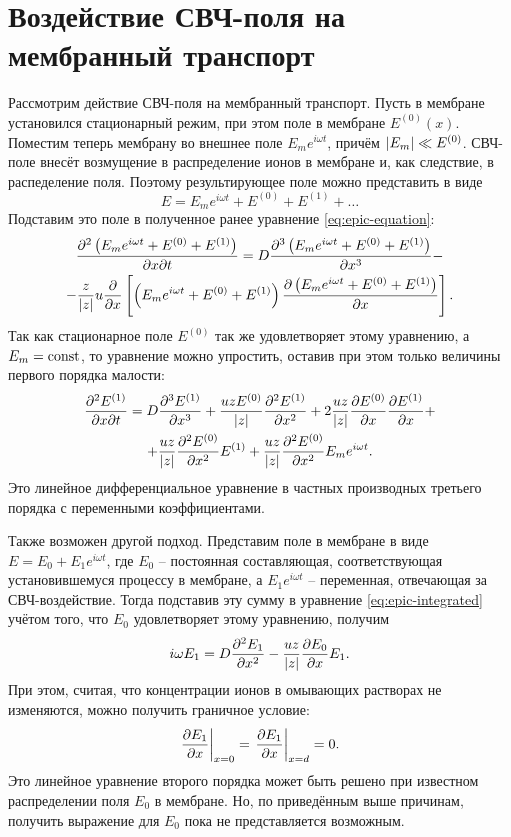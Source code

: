 \section{Воздействие СВЧ-поля на мембранный транспорт}

Рассмотрим действие СВЧ-поля на мембранный транспорт. Пусть в мембране
установился стационарный режим, при этом поле в мембране \( E^{(0)}(x) \).
Поместим теперь мембрану во внешнее поле \( E_m e^{i\omega t} \), причём
\( \left| E_m \right| \ll E^{(0)} \). СВЧ-поле внесёт возмущение в распределение
ионов в мембране и, как следствие, в распеделение поля. Поэтому результирующее
поле можно представить в виде
\begin{equation}
    E = E_m e^{i\omega t} + E^{(0)} + E^{(1)} + \ldots
\end{equation}
Подставим это поле в полученное ранее уравнение \eqref{eq:epic-equation}:
\begin{gather*}
    \frac{\partial^2 \left(E_m e^{i\omega t} + E^{(0)} + E^{(1)}\right)}{\partial x \partial t} =
     D\frac{\partial^3
         \left(E_m e^{i\omega t} + E^{(0)} + E^{(1)}\right)
    }{\partial x^3}
     -\\-
    \frac{z}{\left| z \right|}u\frac{\partial }{\partial x}\left[
    \left(E_m e^{i\omega t} + E^{(0)} + E^{(1)}\right)
    \frac{\partial \left(E_m e^{i\omega t} + E^{(0)} + E^{(1)}\right)}{\partial x}\right].
\end{gather*}
Так как стационарное поле \( E^{(0)} \) так же удовлетворяет этому уравнению,
а \( E_m = \mathrm{const} \), то уравнение можно упростить, оставив при этом только
величины первого порядка малости:
\begin{gather*}
    \frac{\partial^2 E^{(1)}}{\partial x \partial t} = D\frac{\partial^3 E^{(1)}}{\partial x^3} +
    \frac{uzE^{(0)}}{\left| z \right|}\frac{\partial^2 E^{(1)}}{\partial {x}^2} +
    2\frac{uz}{\left| z \right|}\frac{\partial E^{(0)}}{\partial x}\frac{\partial E^{(1)}}{\partial x} + \\ +
    \frac{uz}{\left| z \right|}\frac{\partial^2 E^{(0)}}{\partial {x}^2} E^{(1)} +
    \frac{uz}{\left| z \right|}\frac{\partial^2 E^{(0)}}{\partial {x}^2} E_m e^{i\omega t}.
\end{gather*}
Это линейное дифференциальное уравнение в частных производных третьего
порядка с переменными коэффициентами.

Также возможен другой подход. Представим поле в мембране в виде
\( E = E_0 + E_1e^{i\omega t} \), где \( E_0 \) -- постоянная составляющая,
соответствующая установившемуся процессу в мембране, а \( E_1e^{i\omega t} \)
-- переменная, отвечающая за СВЧ-воздействие. Тогда подставив эту сумму в
уравнение \eqref{eq:epic-integrated} учётом того, что \( E_0 \)
удовлетворяет этому уравнению, получим
\[
    i\omega E_1 = D\frac{\partial^2 E_1}{\partial {x}^2} - \frac{uz}{\left| z \right|}\frac{\partial E_0}{\partial x}E_1.
\]
При этом, считая, что концентрации
ионов в омывающих растворах не изменяются, можно получить граничное условие:
\[
    \left.\frac{\partial E_1}{\partial x}\right|_{x=0} = \left.\frac{\partial E_1}{\partial x}\right|_{x=d} = 0.
\]
Это линейное уравнение второго порядка может быть решено при известном
распределении поля \( E_0 \) в мембране. Но, по приведённым выше причинам,
получить выражение для \( E_0 \) пока не представляется возможным.
